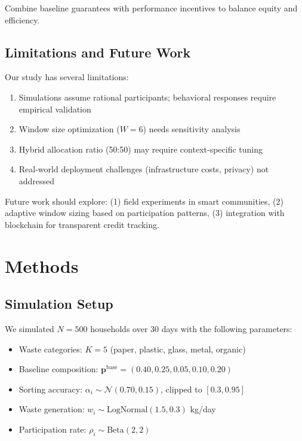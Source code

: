 \documentclass[12pt,a4paper]{article}
\begin{document}
\begin{principle}
Combine baseline guarantees with performance incentives to balance equity and efficiency.
\end{principle}

\subsection{Limitations and Future Work}

Our study has several limitations:
\begin{enumerate}
    \item Simulations assume rational participants; behavioral responses require empirical validation
    \item Window size optimization ($W=6$) needs sensitivity analysis
    \item Hybrid allocation ratio (50:50) may require context-specific tuning
    \item Real-world deployment challenges (infrastructure costs, privacy) not addressed
\end{enumerate}

Future work should explore: (1) field experiments in smart communities, (2) adaptive window sizing based on participation patterns, (3) integration with blockchain for transparent credit tracking.

\section{Methods}

\subsection{Simulation Setup}

We simulated $N=500$ households over 30 days with the following parameters:
\begin{itemize}
    \item Waste categories: $K=5$ (paper, plastic, glass, metal, organic)
    \item Baseline composition: $\mathbf{p}^{\text{base}} = (0.40, 0.25, 0.05, 0.10, 0.20)$
    \item Sorting accuracy: $\alpha_i \sim \mathcal{N}(0.70, 0.15)$, clipped to $[0.3, 0.95]$
    \item Waste generation: $w_i \sim \text{LogNormal}(1.5, 0.3)$ kg/day
    \item Participation rate: $\rho_i \sim \text{Beta}(2, 2)$
\end{itemize}
\end{document}
